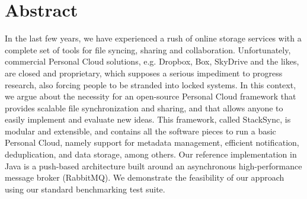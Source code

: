 \chapter{Abstract}
\label{chap:aaa}

In the last few years, we have experienced a rush of online storage services with 
a complete set of tools for file syncing, sharing and collaboration.
Unfortunately, commercial Personal Cloud solutions, e.g. Dropbox, Box, SkyDrive and the likes, are
closed and proprietary, which supposes a serious impediment to progress research, also forcing
people to be stranded into locked systems. In this context, we
argue about the necessity for an open-source Personal Cloud framework that provides scalable file synchronization
and sharing, and that allows anyone to easily	implement and evaluate new ideas.
This framework, called StackSync, is modular and extensible, and contains all the software pieces to run
a basic Personal Cloud, namely support for metadata management, efficient notification, deduplication, and data
storage, among others. Our reference implementation in Java is a push-based architecture built around an asynchronous 
high-performance message broker (RabbitMQ). We demonstrate the feasibility of our approach using
our standard benchmarking test suite.

